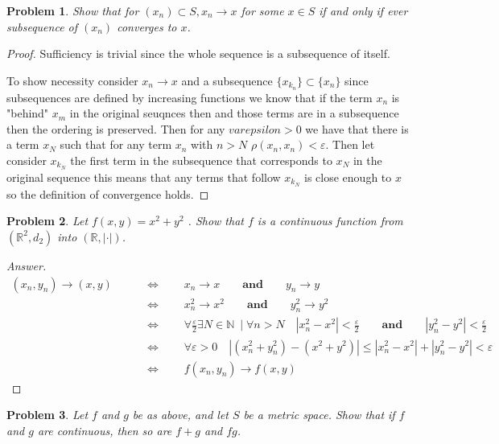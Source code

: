 \documentclass{article}
\newtheorem{problem}{Problem}
\newcommand{\qiffq}{\qquad \iff \qquad}
\newcommand{\qaq}{\qquad \textbf{and} \qquad}
\begin{document}
\begin{problem}
    Show that for $\left(x_{n}\right) \subset S, x_{n} \rightarrow x$ for some $x \in S$ if and only if ever subsequence of $\left(x_{n}\right)$ converges to $x$.
\end{problem}

\begin{proof}
    Sufficiency is trivial since the whole sequence is a subsequence of itself.

    To show necessity consider $x_n\to x$ and a subsequence $\{x_{k_n}\}\subset\{x_{n}\}$ since subsequences are defined by increasing functions we know that if the term $x_n$ is "behind" $x_m$ in the original seuqnces then and those terms are in a subsequence then the ordering is preserved. Then for any $varepsilon>0$ we have that there is a term $x_N$ such that for any term  $x_n$ with $n>N$ $\rho(x_n, x_n)<\varepsilon$. Then let consider $x_{k_{N}}$ the first term in the subsequence that corresponds to $x_N$ in the original sequence this means that any terms that follow $x_{k_{N}}$ is close enough to $x$ so the definition of convergence holds.

\end{proof}

\begin{problem}
    Let $f ( x, y ) = x^2 + y^2$ . Show that $f$ is a continuous function from
    $(\mathbb{R}^2 , d_2 )$ into $(\mathbb{R} , | \cdot |)$.
    
\end{problem}

\begin{proof}[Answer]
    \begin{align*}
        (x_n,y_n)\to (x,y)  & \qiffq x_n \to x \qaq y_n \to y \\ &\qiffq x_n^2 \to x^2 \qaq y_n^2 \to y^2\\ 
                            &\qiffq \forall \frac{\varepsilon}{2} \exists N \in \mathbb{N}\:\mid \forall n>N \quad |x_n^2 - x^2|<\frac{\varepsilon}{2} \qaq |y_n^2 - y^2|<\frac{\varepsilon}{2}\\
                            &\qiffq \forall \varepsilon>0 \quad |(x_n^2+y_n^2) - (x^2+y^2)|\leq |x_n^2 - x^2| + |y_n^2 - y^2| < \varepsilon\\
                            &\qiffq f(x_n,y_n)\to f(x,y)
    \end{align*}
\end{proof}

\begin{problem}
    Let $f$ and $g$ be as above, and let $S$ be a metric space. Show that if $f$ and $g$ are continuous, then so are $f+g$ and $f g$.
\end{problem}
\end{document}

